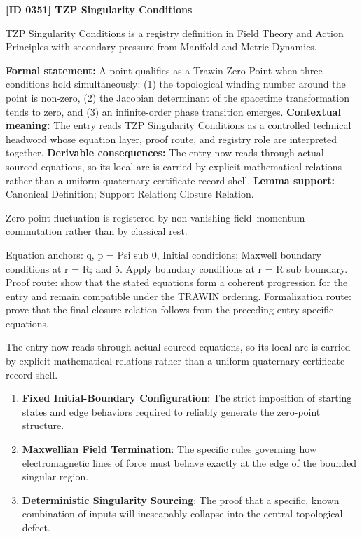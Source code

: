 \clearpage
\noindent\textbf{[ID 0351] TZP Singularity Conditions}\par
\vspace{0.35em}
\begingroup\small
{}
TZP Singularity Conditions is a registry definition in Field Theory and Action Principles with secondary pressure from Manifold and Metric Dynamics.

\begingroup\footnotesize\setlength{\emergencystretch}{3em}\sloppy
\textbf{Formal statement:} A point qualifies as a Trawin Zero Point when three conditions hold simultaneously: (1) the topological winding number around the point is non-zero, (2) the Jacobian determinant of the spacetime transformation tends to zero, and (3) an infinite-order phase transition emerges. \textbf{Contextual meaning:} The entry reads TZP Singularity Conditions as a controlled technical headword whose equation layer, proof route, and registry role are interpreted together. \textbf{Derivable consequences:} The entry now reads through actual sourced equations, so its local arc is carried by explicit mathematical relations rather than a uniform quaternary certificate record shell. \textbf{Lemma support:} Canonical Definition; Support Relation; Closure Relation.\par
\endgroup

Zero-point fluctuation is registered by non-vanishing field--momentum commutation rather than by classical rest.

Equation anchors: q, p = Psi sub 0, Initial conditions; Maxwell boundary conditions at r = R; and 5. Apply boundary conditions at r = R sub boundary. Proof route: show that the stated equations form a coherent progression for the entry and remain compatible under the TRAWIN ordering. Formalization route: prove that the final closure relation follows from the preceding entry-specific equations.

The entry now reads through actual sourced equations, so its local arc is carried by explicit mathematical relations rather than a uniform quaternary certificate record shell.
\endgroup

\begin{enumerate}[leftmargin=1.6em,itemsep=6pt,topsep=4pt]
\item \textbf{Fixed Initial-Boundary Configuration}: The strict imposition of starting states and edge behaviors required to reliably generate the zero-point structure.
\item \textbf{Maxwellian Field Termination}: The specific rules governing how electromagnetic lines of force must behave exactly at the edge of the bounded singular region.
\item \textbf{Deterministic Singularity Sourcing}: The proof that a specific, known combination of inputs will inescapably collapse into the central topological defect.
\end{enumerate}

